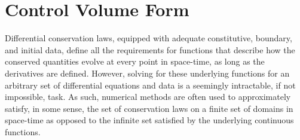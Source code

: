 \documentclass[Prelim,12pt]{WisconsinThesis}
\begin{document}
\section{Control Volume Form}

Differential conservation laws, equipped with adequate constitutive, boundary, and initial data, define all the requirements for functions that describe how the conserved quantities evolve at every point in space-time, as long as the derivatives are defined.
However, solving for these underlying functions for an arbitrary set of differential equations and data is a seemingly intractable, if not impossible, task.
As such, numerical methods are often used to approximately satisfy, in some sense, the set of conservation laws on a finite set of domains in space-time as opposed to the infinite set satisfied by the underlying continuous functions.
\end{document}
